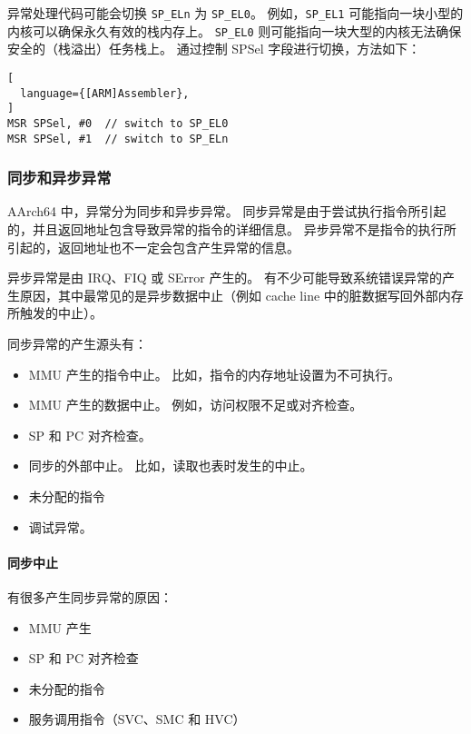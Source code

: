 异常处理代码可能会切换 \lstinline!SP_ELn! 为 \lstinline!SP_EL0!。
例如，\lstinline!SP_EL1! 可能指向一块小型的内核可以确保永久有效的栈内存上。
\lstinline!SP_EL0! 则可能指向一块大型的内核无法确保安全的（栈溢出）任务栈上。
通过控制 SPSel 字段进行切换，方法如下：

\begin{lstlisting}[
  language={[ARM]Assembler},
]
MSR SPSel, #0  // switch to SP_EL0
MSR SPSel, #1  // switch to SP_ELn
\end{lstlisting}

\subsubsection{同步和异步异常}

AArch64 中，异常分为同步和异步异常。
同步异常是由于尝试执行指令所引起的，并且返回地址包含导致异常的指令的详细信息。
异步异常不是指令的执行所引起的，返回地址也不一定会包含产生异常的信息。

异步异常是由 IRQ、FIQ 或 SError 产生的。
有不少可能导致系统错误异常的产生原因，其中最常见的是异步数据中止（例如 cache line 中的脏数据写回外部内存所触发的中止）。

同步异常的产生源头有：

\begin{itemize}
  \item MMU 产生的指令中止。
    比如，指令的内存地址设置为不可执行。
  \item MMU 产生的数据中止。
    例如，访问权限不足或对齐检查。
  \item SP 和 PC 对齐检查。
  \item 同步的外部中止。
    比如，读取也表时发生的中止。
  \item 未分配的指令
  \item 调试异常。
\end{itemize}

\paragraph*{同步中止}

有很多产生同步异常的原因：

\begin{itemize}
  \item MMU 产生
  \item SP 和 PC 对齐检查
  \item 未分配的指令
  \item 服务调用指令（SVC、SMC 和 HVC）
\end{itemize}

